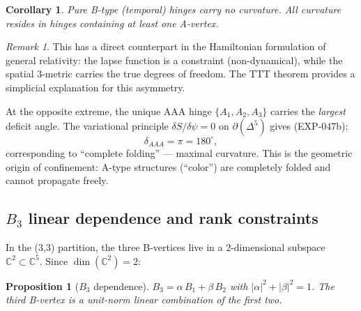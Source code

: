 \documentclass[12pt]{article}
\newtheorem{corollary}[theorem]{Corollary}
\newtheorem{proposition}[theorem]{Proposition}
\theoremstyle{remark}
\newtheorem{remark}[theorem]{Remark}
\theoremstyle{definition}
\newcommand{\CC}{\mathbb{C}}
\begin{document}
\begin{corollary}
Pure B-type (temporal) hinges carry no curvature.  All curvature resides in hinges containing at least one A-vertex.
\end{corollary}

\begin{remark}
This has a direct counterpart in the Hamiltonian formulation of general relativity: the lapse function is a constraint (non-dynamical), while the spatial 3-metric carries the true degrees of freedom.  The TTT theorem provides a simplicial explanation for this asymmetry.
\end{remark}

At the opposite extreme, the unique AAA hinge $\{A_1, A_2, A_3\}$ carries the \emph{largest} deficit angle.  The variational principle $\delta S/\delta\psi = 0$ on $\partial(\Delta^5)$ gives (EXP-047b):
\begin{equation}
\delta_{AAA} = \pi = 180^\circ,
\end{equation}
corresponding to ``complete folding'' --- maximal curvature.  This is the geometric origin of confinement: A-type structures (``color'') are completely folded and cannot propagate freely.

\subsection{$B_3$ linear dependence and rank constraints}
\label{sec:B3_dependence}

In the (3,3) partition, the three B-vertices live in a 2-dimensional subspace $\CC^2 \subset \CC^5$.  Since $\dim(\CC^2) = 2$:

\begin{proposition}[$B_3$ dependence]
\label{prop:B3}
$B_3 = \alpha\, B_1 + \beta\, B_2$ with $|\alpha|^2 + |\beta|^2 = 1$.  The third B-vertex is a unit-norm linear combination of the first two.
\end{proposition}
\end{document}
